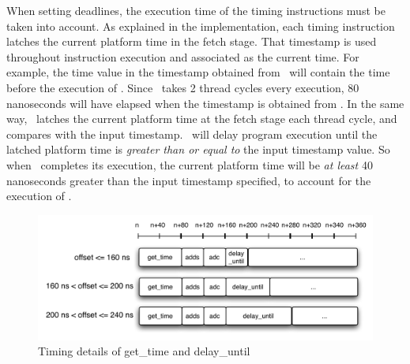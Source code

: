 When setting deadlines, the execution time of the timing instructions must be taken into account. 
As explained in the implementation, each timing instruction latches the current platform time in the fetch stage.
That timestamp is used throughout instruction execution and associated as the current time.  
For example, the time value in the timestamp obtained from \gettime\ will contain the time before the execution of \gettime.
Since \gettime\ takes 2 thread cycles every execution, 80 nanoseconds will have elapsed when the timestamp is obtained from \gettime.
In the same way, \delayuntil\ latches the current platform time at the fetch stage each thread cycle, and compares with the input timestamp. 
\Delayuntil\ will delay program execution until the latched platform time is \emph{greater than or equal to} the input timestamp value.
So when \delayuntil\ completes its execution, the current platform time will be \emph{at least} 40 nanoseconds greater than the input timestamp specified, to account for the execution of \delayuntil. 

\begin{figure}[h]
  \begin{center}
    \includegraphics[scale=.7]{figs/delay_until_details}
  \end{center}
  \vspace{-3mm}
  \caption{Timing details of get\_time and delay\_until}
  \label{fig:delay_until_details}
\end{figure}


